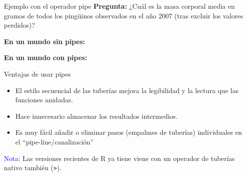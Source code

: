 \documentclass[
  ignorenonframetext,
  aspectratio=169]{beamer}
\newenvironment{Shaded}{\begin{snugshade}}{\end{snugshade}}
\newcommand{\AttributeTok}[1]{\textcolor[rgb]{0.13,0.29,0.53}{#1}}
\newcommand{\CommentTok}[1]{\textcolor[rgb]{0.56,0.35,0.01}{\textit{#1}}}
\newcommand{\DecValTok}[1]{\textcolor[rgb]{0.00,0.00,0.81}{#1}}
\newcommand{\FunctionTok}[1]{\textcolor[rgb]{0.13,0.29,0.53}{\textbf{#1}}}
\newcommand{\NormalTok}[1]{#1}
\newcommand{\OtherTok}[1]{\textcolor[rgb]{0.56,0.35,0.01}{#1}}
\newcommand{\SpecialCharTok}[1]{\textcolor[rgb]{0.81,0.36,0.00}{\textbf{#1}}}
\newcommand\blue[1]{\textcolor{blue}{#1}}
\begin{document}
\begin{frame}[fragile]{Ejemplo con el operador pipe}
\label{ejemplo-con-el-operador-pipe}
\textbf{Pregunta:} ¿Cuál es la masa corporal media en gramos de todos
los pingüinos observados en el año 2007 (tras excluir los valores
perdidos)?

\textbf{En un mundo sin pipes:}

\begin{Shaded}
\end{Shaded}

\textbf{En un mundo con pipes:}

\begin{Shaded}
\end{Shaded}
\end{frame}

\begin{frame}[fragile]{Ventajas de usar pipes}
\label{ventajas-de-usar-pipes}
\begin{itemize}
\item
  El estilo secuencial de las tuberías mejora la legibilidad y la
  lectura que las funciones anidadas.
\item
  Hace innecesario almacenar los resultados intermedios.
\item
  Es muy fácil añadir o eliminar pasos (empalmes de tuberías)
  individuales en el ``pipe-line/canalización''
\end{itemize}

\blue{Nota:} Las versiones recientes de R ya tiene viene con un operador
de tuberías nativo también (\texttt{\textbar{}\textgreater{}}).
\end{frame}
\end{document}
